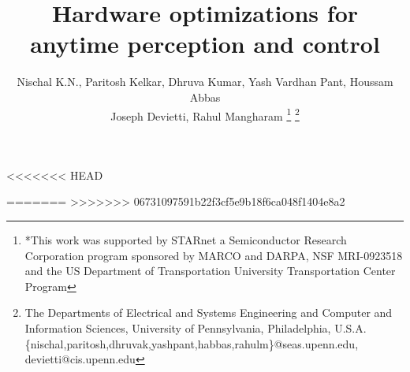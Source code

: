 \documentclass[a4paper, 10pt, conference]{ieeeconf}      %
\title{\LARGE \bf
Hardware optimizations for anytime perception and control
}
\author{ Nischal K.N., Paritosh Kelkar, Dhruva Kumar, Yash Vardhan Pant, Houssam Abbas\\
	 Joseph Devietti, Rahul Mangharam%
\thanks{*This work was supported by STARnet a Semiconductor Research
Corporation program sponsored by MARCO and DARPA, NSF MRI-0923518 and the US Department of Transportation University Transportation Center Program}%
\thanks{The Departments of Electrical and Systems Engineering and Computer and Information Sciences, University of Pennsylvania, Philadelphia, U.S.A.
        {\small
        \{nischal,paritosh,dhruvak,yashpant,habbas,rahulm\}@seas.upenn.edu, devietti@cis.upenn.edu}}%
}
\begin{document}
\maketitle
\thispagestyle{empty}
\pagestyle{empty}

<<<<<<< HEAD

%
%
%
=======
>>>>>>> 06731097591b22f3cf5e9b18f6ca048f1404e8a2




	


	
\end{document}
